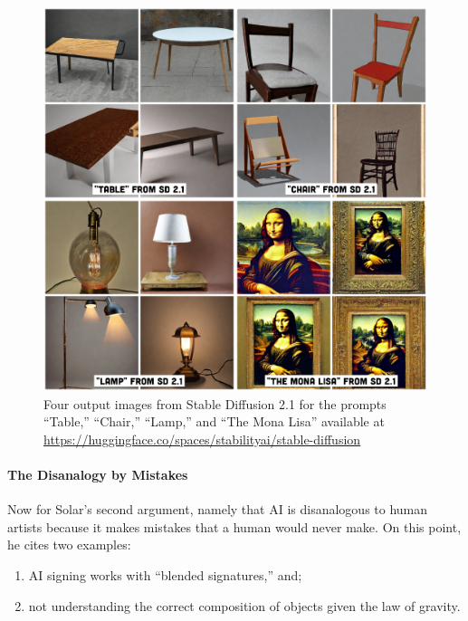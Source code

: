 \documentclass[11pt]{article}
\begin{document}
\begin{figure}[htbp]
\centering
\includegraphics[width=.9\linewidth]{./images/ai-generic-objects-combined.png}
\caption{Four output images from Stable Diffusion 2.1 for the prompts ``Table,'' ``Chair,'' ``Lamp,'' and ``The Mona Lisa'' available at \url{https://huggingface.co/spaces/stabilityai/stable-diffusion}}
\end{figure}

\paragraph*{The Disanalogy by Mistakes}
\label{sec:org3e4fb43}
Now for Solar's second argument, namely that AI is disanalogous to human artists because it makes mistakes that a human would never make. On this point, he cites two examples:
\begin{enumerate}
\item AI signing works with ``blended signatures,'' and;
\item not understanding the correct composition of objects given the law of gravity.
\end{enumerate}
\end{document}
